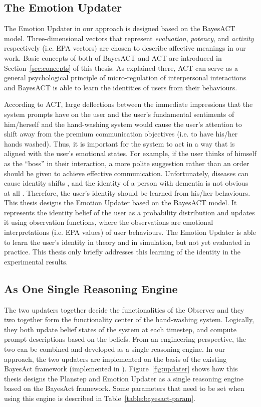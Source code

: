 \subsection{The Emotion Updater}

The Emotion Updater in our approach is designed based on the BayesACT model. Three-dimensional vectors that represent \textit{evaluation}, \textit{potency}, and \textit{activity} respectively (i.e. EPA vectors) are chosen to describe affective meanings in our work. Basic concepts of both of BayesACT and ACT are introduced in Section~\ref{sec:concepts} of this thesis. As explained there, ACT can serve as a general psychological principle of micro-regulation of interpersonal interactions and BayesACT is able to learn the identities of users from their behaviours.

According to ACT, large deflections between the immediate impressions that the system prompts have on the user and the user's fundamental sentiments of him/herself and the hand-washing system would cause the user's attention to shift away from the premium communication objectives (i.e. to have his/her hands washed). Thus, it is important for the system to act in a way that is aligned with the user's emotional states. For example, if the user thinks of himself as the ``boss'' in their interaction, a more polite suggestion rather than an order should be given to achieve effective communication. Unfortunately, diseases can cause identity shifts \cite{lively2011identity}, and the identity of a person with dementia is not obvious at all \cite{orona1990temporality, rose2004memory}. Therefore, the user's identity should be learned from his/her behaviours. This thesis designs the Emotion Updater based on the BayesACT model. It represents the identity belief of the user as a probability distribution and updates it using observation functions, where the observations are emotional interpretations (i.e. EPA values) of user behaviours. The Emotion Updater is able to learn the user's identity in theory and in simulation, but not yet evaluated in practice. This thesis only briefly addresses this learning of the identity in the experimental results. 

\subsection{As One Single Reasoning Engine}

The two updaters together decide the functionalities of the Observer and they two together form the functionality center of the hand-washing system. Logically, they both update belief states of the system at each timestep, and compute prompt descriptions based on the beliefs. From an engineering perspective, the two can be combined and developed as a single reasoning engine. In our approach, the two updaters are implemented on the basis of the existing BayesAct framework (implemented in \cite{hoey2013bayesian}). Figure~\ref{fig:updater} shows how this thesis designs the Planstep and Emotion Updater as a single reasoning engine based on the BayesAct framework. Some parameters that need to be set when using this engine is described in Table~\ref{table:bayesact-param}.

